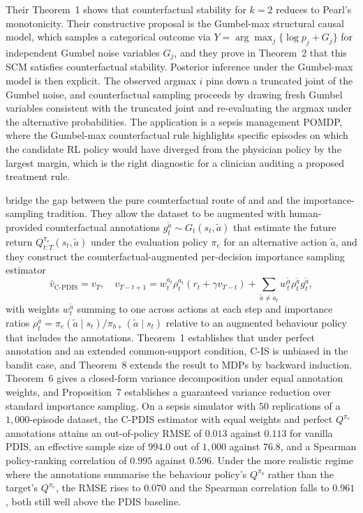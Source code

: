 Their Theorem~1 shows that counterfactual stability for $k = 2$ reduces to
Pearl's monotonicity. Their constructive proposal is the Gumbel-max structural
causal model, which samples a categorical outcome via
$Y = \arg\max_j \{ \log p_j + G_j \}$ for independent Gumbel noise variables
$G_j$, and they prove in Theorem~2 that this SCM satisfies counterfactual
stability. Posterior inference under the Gumbel-max model is then explicit. The
observed argmax $i$ pins down a truncated joint of the Gumbel noise, and
counterfactual sampling proceeds by drawing fresh Gumbel variables consistent
with the truncated joint and re-evaluating the argmax under the alternative
probabilities. The application is a sepsis management POMDP, where the
Gumbel-max counterfactual rule highlights specific episodes on which the
candidate RL policy would have diverged from the physician policy by the largest
margin, which is the right diagnostic for a clinician auditing a proposed
treatment rule.

\citet{TangWiens2023} bridge the gap between the pure counterfactual route of
\citet{Buesing2019} and \citet{Oberst2019} and the importance-sampling
tradition. They allow the dataset to be augmented with human-provided
counterfactual annotations $g^{\tilde a}_t \sim G_t(s_t, \tilde a)$ that estimate
the future return $Q^{\pi_e}_{t:T}(s_t, \tilde a)$ under the evaluation policy
$\pi_e$ for an alternative action $\tilde a$, and they construct the
counterfactual-augmented per-decision importance sampling estimator
\begin{equation}
\hat v_{\mathrm{C\text{-}PDIS}}
= v_T,
\quad
v_{T-t+1}
= w^{a_t}_t \rho^{a_t}_t (r_t + \gamma v_{T-t})
+ \sum_{\tilde a \ne a_t} w^{\tilde a}_t \rho^{\tilde a}_t g^{\tilde a}_t,
\label{eq:tangwiens_cpdis}
\end{equation}
with weights $w^{\tilde a}_t$ summing to one across actions at each step and
importance ratios $\rho^{\tilde a}_t = \pi_e(\tilde a \mid s_t) /
\pi_{b+}(\tilde a \mid s_t)$ relative to an augmented behaviour policy that
includes the annotations. Theorem~1 establishes that under perfect annotation
and an extended common-support condition, C-IS is unbiased in the bandit case,
and Theorem~8 extends the result to MDPs by backward induction. Theorem~6
gives a closed-form variance decomposition under equal annotation weights,
and Proposition~7 establishes a guaranteed variance reduction over standard
importance sampling. On a sepsis simulator with $50$ replications of a
$1{,}000$-episode dataset, the C-PDIS estimator with equal weights and perfect
$Q^{\pi_e}$ annotations attains an out-of-policy RMSE of $0.013$ against $0.113$
for vanilla PDIS, an effective sample size of $994.0$ out of $1{,}000$ against
$76.8$, and a Spearman policy-ranking correlation of $0.995$ against $0.596$.
Under the more realistic regime where the annotations summarise the behaviour
policy's $Q^{\pi_b}$ rather than the target's $Q^{\pi_e}$, the RMSE rises to
$0.070$ and the Spearman correlation falls to $0.961$, both still well above
the PDIS baseline.

